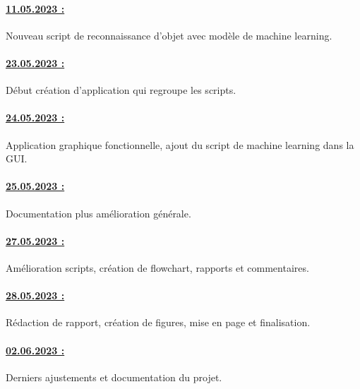 \documentclass[a4paper, 12pt]{article}
\begin{document}
        \paragraph{\underline{11.05.2023 :}} Nouveau script de reconnaissance d'objet avec modèle de machine learning.

        \paragraph{\underline{23.05.2023 :}} Début création d'application qui regroupe les scripts.

        \paragraph{\underline{24.05.2023 :}} Application graphique fonctionnelle, ajout du script de machine learning dans la GUI.

        \paragraph{\underline{25.05.2023 :}} Documentation plus amélioration générale. 

        \paragraph{\underline{27.05.2023 :}} Amélioration scripts, création de flowchart, rapports et commentaires.

        \paragraph{\underline{28.05.2023 :}} Rédaction de rapport, création de figures, mise en page et finalisation.

        \paragraph{\underline{02.06.2023 :}} Derniers ajustements et documentation du projet.

        

        
        
\end{document}
